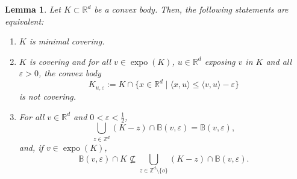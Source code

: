 \documentclass[11pt, a4paper]{amsart}
\newcommand{\RR}{\mathbb{R}}
\newcommand{\ZZ}{\mathbb{Z}}
\newcommand{\ball}{\mathbb{B}}
\DeclareMathOperator{\expo}{expo}
\newcommand{\origin}{o}
\numberwithin{equation}{section}
\theoremstyle{plain}
\newtheorem{lemma}[theorem]{Lemma}
\begin{document}
\begin{lemma}
\label{lemma:balls_lemma} Let $K\subset \RR^d$ be a convex body. Then, the following statements are equivalent:
\begin{enumerate}
\item $K$ is minimal covering.
\item $K$ is covering and for all $v\in \expo(K)$, $u\in \RR^d$ exposing $v$ in $K$ and all $\varepsilon>0$, the convex body
$$K_{u, \varepsilon}:=K\cap \{x\in \RR^d \; | \; \langle x,u\rangle \leq \langle v,u\rangle-\varepsilon \}$$
is not covering.
\item For all $v\in \RR^d$ and $0<\varepsilon<\frac{1}{2}$, 
\begin{equation}\label{eq:balls_covering}
\bigcup \limits_{z\in \ZZ^d} (K-z) \cap \ball (v, \varepsilon)=\ball(v,\varepsilon),
\end{equation}
and, if $v\in\expo(K)$,
\begin{equation}\label{eq:balls_condition}
\ball(v,\varepsilon)\cap K \not\subseteq\bigcup \limits_{z\in \ZZ^d\setminus \{\origin\}} (K-z) \cap \ball (v, \varepsilon).
\end{equation}
\end{enumerate}
\end{lemma}
\end{document}
